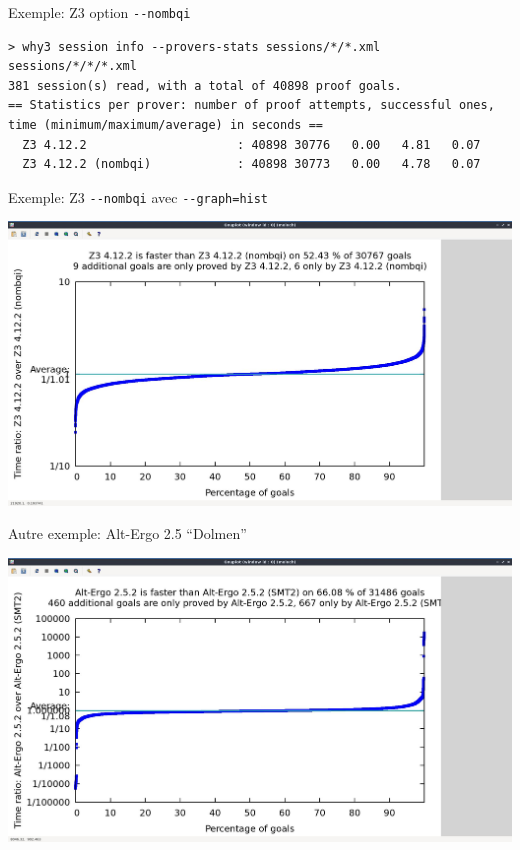 \documentclass{beamer}
\begin{document}
\begin{frame}[fragile]{Exemple: Z3 option \texttt{-{}-nombqi}}

\begin{lstlisting}
> why3 session info --provers-stats sessions/*/*.xml sessions/*/*/*.xml
381 session(s) read, with a total of 40898 proof goals.
== Statistics per prover: number of proof attempts, successful ones, time (minimum/maximum/average) in seconds ==
  Z3 4.12.2                     : 40898 30776   0.00   4.81   0.07
  Z3 4.12.2 (nombqi)            : 40898 30773   0.00   4.78   0.07
\end{lstlisting}

\end{frame}


\begin{frame}{Exemple: Z3 \texttt{-{}-nombqi} avec \texttt{-{}-graph=hist}}

  \begin{center}
    \includegraphics[width=\textwidth]{z3_nombqi.jpg}
  \end{center}

\end{frame}

\begin{frame}{Autre exemple: Alt-Ergo 2.5 ``Dolmen''}

  \begin{center}
    \includegraphics[width=\textwidth]{alt_ergo_smt.jpg}
  \end{center}

\end{frame}
\end{document}
